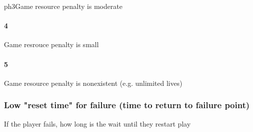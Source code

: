 ph{3}Game resource penalty is moderate\paragraph{4}Game resrouce penalty is small\paragraph{5}Game resource penalty is nonexistent (e.g. unlimited lives)\subsubsection{Low "reset time" for failure (time to return to failure point)}If the player fails, how long is the wait until they restart play